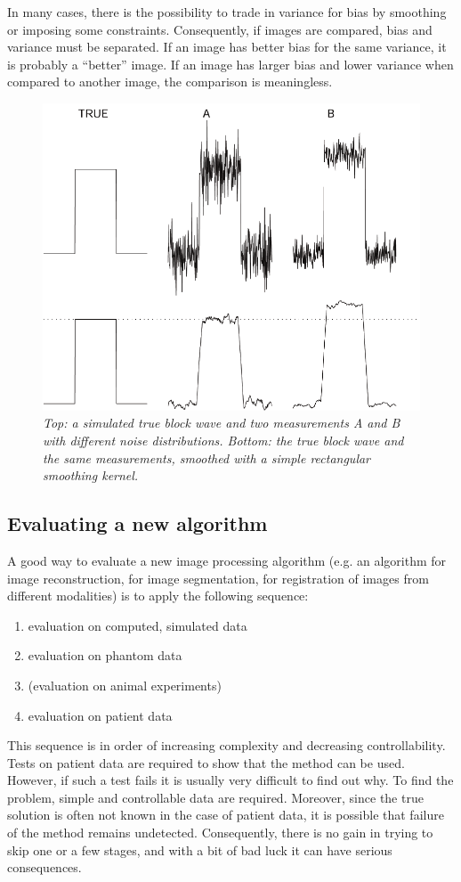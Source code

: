 In many cases, there is the possibility to trade in variance for bias by
smoothing or imposing some constraints. Consequently, if images are compared,
bias and variance must be separated. If an image has better bias for the same
variance, it is probably a ``better'' image. If an image has larger bias and
lower variance when compared to another image, the comparison is meaningless.

\begin{figure}[tb]
\centering
\includegraphics[width=\figone]{figs/fig_bias_var.pdf}
\caption{\label{fig:bias_var} \emph{Top: a simulated true block wave and two
measurements A and B with different noise distributions. Bottom: the true
block wave and the same measurements, smoothed with a simple rectangular
smoothing kernel.}}
\end{figure}

\subsection{Evaluating a new algorithm}
A good way to evaluate a new image processing algorithm (e.g. an algorithm for
image reconstruction, for image segmentation, for registration of images from
different modalities) is to apply the following sequence:
\begin{enumerate}
  \item evaluation on computed, simulated data
  \item evaluation on phantom data
  \item (evaluation on animal experiments)
  \item evaluation on patient data
\end{enumerate}
This sequence is in order of increasing complexity and decreasing
controllability. Tests on patient data are required to show that the method
can be used. However, if such a test fails it is usually very difficult to
find out why. To find the problem, simple and controllable data are required.
Moreover, since the true solution is often not known in the case of patient
data, it is possible that failure of the method remains undetected.
Consequently, there is no gain in trying to skip one or a few stages, and with
a bit of bad luck it can have serious consequences.

